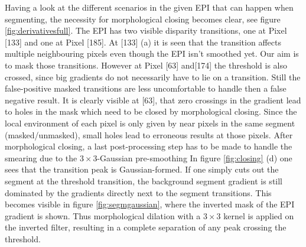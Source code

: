\documentclass  [
  paper    = a4,
  BCOR     = 10mm,
  twoside,
  fontsize = 12pt,
  fleqn,
  toc      = bibnumbered,
  toc      = listofnumbered,
  numbers  = noendperiod,
  headings = normal,
  listof   = leveldown,
  version  = 3.03
]                                       {scrreprt}
\begin{document}
 Having a look at the different scenarios in the given EPI that can happen when segmenting, the necessity for morphological closing becomes clear, see figure \ref{fig:derivativesfull}. The EPI has two visible disparity transitions, one at Pixel [133] and one at Pixel [185]. At [133] (a) it is seen that the transition affects multiple neighbouring pixels even though the EPI isn't smoothed yet. Our aim is to mask those transitions. However at Pixel [63] and[174] the threshold is also crossed, since big gradients do not necessarily have to lie on a transition. Still the false-positive masked transitions are less uncomfortable to handle then a false negative result. It is clearly visible at [63], that zero crossings in the gradient lead to holes in the mask which need to be closed by morphological closing. Since the local environment of each pixel is only given by near pixels in the same segment (masked/unmasked), small holes lead to erroneous results at those pixels. After morphological closing, a last post-processing step has to be made to handle the smearing due to the $3\times 3$-Gaussian pre-smoothing In figure \ref{fig:closing} (d) one sees that the transition peak is Gaussian-formed. If one simply cuts out the segment at the threshold transition, the background segment gradient is still dominated by the gradients directly next to the segment transitions. This becomes visible in figure \ref{fig:segmgaussian}, where the inverted mask of the EPI gradient is shown. Thus morphological dilation with a $3\times3$ kernel is applied on the inverted filter, resulting in a complete separation of any peak crossing the threshold.
 
 
 
\end{document}
